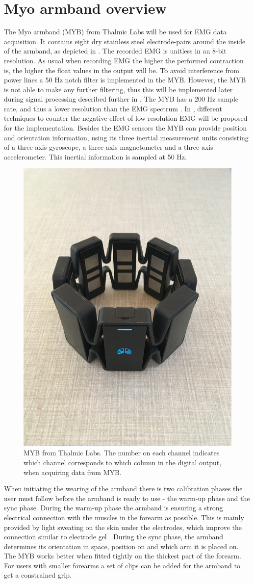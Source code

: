 \section{Myo armband overview} \label{sec:MYB}

The Myo armband (MYB) from Thalmic Labs will be used for EMG data acquisition. It contains eight dry stainless steel electrode-pairs around the inside of the armband, as depicted in . The recorded EMG is unitless in an 8-bit resolution. As usual when recording EMG the higher the performed contraction is, the higher the float values in the output will be. To avoid interference from power lines a 50 Hz notch filter is implemented in the MYB. However, the MYB is not able to make any further filtering, thus this will be implemented later during signal processing described further in . The MYB has a 200 Hz sample rate, and thus a lower resolution than the EMG spectrum \cite{Cram2012}. In , different techniques to counter the negative effect of low-resolution EMG will be proposed for the implementation. Besides the EMG sensors the MYB can provide position and orientation information, using its three inertial measurement units consisting of a three axis gyroscope, a three axis magnetometer and a three axis accelerometer. This inertial information is sampled at 50 Hz. \cite{Myoarmband2013}

\begin{figure}[H]                 
	\includegraphics[width=.4\textwidth]{figures/xBackground/myoband}  
	\caption{MYB from Thalmic Labs. The number on each channel indicates which channel corresponds to which column in the digital output, when acquiring data from MYB.}
	\label{fig:myoarmband} 
\end{figure}

When initiating the wearing of the armband there is two calibration phases the user must follow before the armband is ready to use - the warm-up phase and the sync phase. During the warm-up phase the armband is ensuring a strong electrical connection with the muscles in the forearm as possible. This is mainly provided by light sweating on the skin under the electrodes, which improve the connection similar to electrode gel \cite{Cram2012}. During the sync phase, the armband determines its orientation in space, position on and which arm it is placed on. The MYB works better when fitted tightly on the thickest part of the forearm. For users with smaller forearms a set of clips can be added for the armband to get a constrained grip. \cite{Myoarmband2013}
